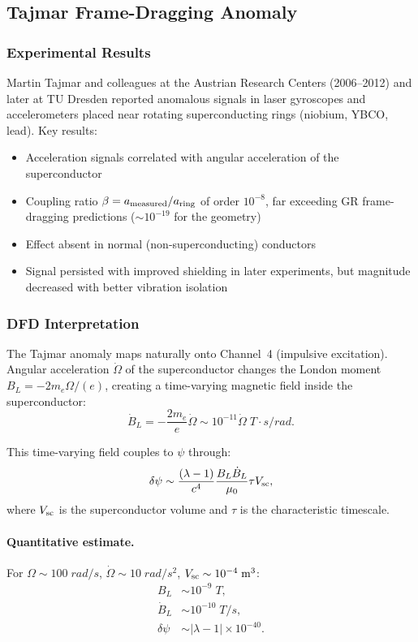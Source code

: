 \documentclass[aps,prd,twocolumn,superscriptaddress,floatfix,nofootinbib]{revtex4-2}
\newcommand{\lam}{\lambda}
\begin{document}
\subsection{Tajmar Frame-Dragging Anomaly}\label{sec:tajmar}

\subsubsection{Experimental Results}

Martin Tajmar and colleagues at the Austrian Research Centers
(2006--2012) and later at TU Dresden reported anomalous signals in
laser gyroscopes and accelerometers placed near rotating
superconducting rings (niobium, YBCO, lead). Key results:
\begin{itemize}[nosep]
\item Acceleration signals correlated with angular acceleration
of the superconductor
\item Coupling ratio $\beta = a_{\rm measured}/a_{\rm ring}$
of order $10^{-8}$, far exceeding GR frame-dragging predictions
($\sim 10^{-19}$ for the geometry)
\item Effect absent in normal (non-superconducting) conductors
\item Signal persisted with improved shielding in later experiments,
but magnitude decreased with better vibration isolation
\end{itemize}

\subsubsection{DFD Interpretation}

The Tajmar anomaly maps naturally onto Channel~4 (impulsive excitation).
Angular acceleration $\dot\Omega$ of the superconductor changes the
London moment $B_L = -2m_e\Omega/(e)$, creating a time-varying magnetic
field inside the superconductor:
\begin{equation}
\dot{B}_L = -\frac{2m_e}{e}\dot\Omega \sim 10^{-11}\dot\Omega
\;\si{T\cdot s/rad}.
\end{equation}

This time-varying field couples to $\psi$ through:
\begin{equation}
\delta\psi \sim \frac{(\lam-1)}{c^4}\frac{B_L\dot{B}_L}{\mu_0}\tau V_{\rm sc},
\end{equation}
where $V_{\rm sc}$ is the superconductor volume and $\tau$ is the
characteristic timescale.

\paragraph{Quantitative estimate.}
For $\Omega \sim 100\;\si{rad/s}$, $\dot\Omega \sim 10\;\si{rad/s^2}$,
$V_{\rm sc} \sim 10^{-4}\;\si{m^3}$:
\begin{align}
B_L &\sim 10^{-9}\;\si{T},\\
\dot{B}_L &\sim 10^{-10}\;\si{T/s},\\
\delta\psi &\sim |\lam-1| \times 10^{-40}.
\end{align}
\end{document}
